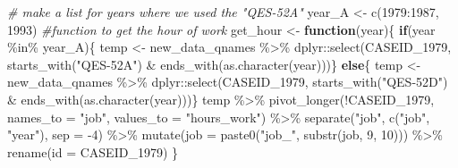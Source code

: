 \documentclass{article}
\newenvironment{Shaded}{\begin{snugshade}}{\end{snugshade}}
\newcommand{\AttributeTok}[1]{\textcolor[rgb]{0.77,0.63,0.00}{#1}}
\newcommand{\CommentTok}[1]{\textcolor[rgb]{0.56,0.35,0.01}{\textit{#1}}}
\newcommand{\ControlFlowTok}[1]{\textcolor[rgb]{0.13,0.29,0.53}{\textbf{#1}}}
\newcommand{\DecValTok}[1]{\textcolor[rgb]{0.00,0.00,0.81}{#1}}
\newcommand{\FunctionTok}[1]{\textcolor[rgb]{0.00,0.00,0.00}{#1}}
\newcommand{\NormalTok}[1]{#1}
\newcommand{\OtherTok}[1]{\textcolor[rgb]{0.56,0.35,0.01}{#1}}
\newcommand{\SpecialCharTok}[1]{\textcolor[rgb]{0.00,0.00,0.00}{#1}}
\newcommand{\StringTok}[1]{\textcolor[rgb]{0.31,0.60,0.02}{#1}}
\begin{document}
\begin{Shaded}
\begin{Highlighting}[]
\CommentTok{\# make a list for years where we used the "QES{-}52A"}
\NormalTok{year\_A }\OtherTok{\textless{}{-}} \FunctionTok{c}\NormalTok{(}\DecValTok{1979}\SpecialCharTok{:}\DecValTok{1987}\NormalTok{, }\DecValTok{1993}\NormalTok{)}
\CommentTok{\#function to get the hour of work}
\NormalTok{get\_hour }\OtherTok{\textless{}{-}} \ControlFlowTok{function}\NormalTok{(year)\{}
  \ControlFlowTok{if}\NormalTok{(year }\SpecialCharTok{\%in\%}\NormalTok{ year\_A)\{}
\NormalTok{   temp }\OtherTok{\textless{}{-}}\NormalTok{ new\_data\_qnames }\SpecialCharTok{\%\textgreater{}\%}
\NormalTok{    dplyr}\SpecialCharTok{::}\FunctionTok{select}\NormalTok{(CASEID\_1979,}
            \FunctionTok{starts\_with}\NormalTok{(}\StringTok{"QES{-}52A"}\NormalTok{) }\SpecialCharTok{\&}
              \FunctionTok{ends\_with}\NormalTok{(}\FunctionTok{as.character}\NormalTok{(year)))\} }
  \ControlFlowTok{else}\NormalTok{\{}
\NormalTok{    temp }\OtherTok{\textless{}{-}}\NormalTok{ new\_data\_qnames }\SpecialCharTok{\%\textgreater{}\%}
\NormalTok{    dplyr}\SpecialCharTok{::}\FunctionTok{select}\NormalTok{(CASEID\_1979,}
            \FunctionTok{starts\_with}\NormalTok{(}\StringTok{"QES{-}52D"}\NormalTok{) }\SpecialCharTok{\&}
              \FunctionTok{ends\_with}\NormalTok{(}\FunctionTok{as.character}\NormalTok{(year)))\} }
\NormalTok{    temp }\SpecialCharTok{\%\textgreater{}\%} 
      \FunctionTok{pivot\_longer}\NormalTok{(}\SpecialCharTok{!}\NormalTok{CASEID\_1979,}
                 \AttributeTok{names\_to =} \StringTok{"job"}\NormalTok{,}
                 \AttributeTok{values\_to =} \StringTok{"hours\_work"}\NormalTok{) }\SpecialCharTok{\%\textgreater{}\%}
      \FunctionTok{separate}\NormalTok{(}\StringTok{"job"}\NormalTok{, }\FunctionTok{c}\NormalTok{(}\StringTok{"job"}\NormalTok{, }\StringTok{"year"}\NormalTok{), }\AttributeTok{sep =} \SpecialCharTok{{-}}\DecValTok{4}\NormalTok{) }\SpecialCharTok{\%\textgreater{}\%}
      \FunctionTok{mutate}\NormalTok{(}\AttributeTok{job =} \FunctionTok{paste0}\NormalTok{(}\StringTok{"job\_"}\NormalTok{, }\FunctionTok{substr}\NormalTok{(job, }\DecValTok{9}\NormalTok{, }\DecValTok{10}\NormalTok{))) }\SpecialCharTok{\%\textgreater{}\%}
      \FunctionTok{rename}\NormalTok{(}\AttributeTok{id =}\NormalTok{ CASEID\_1979)}
\NormalTok{\}}


\end{Highlighting}
\end{Shaded}
\end{document}
